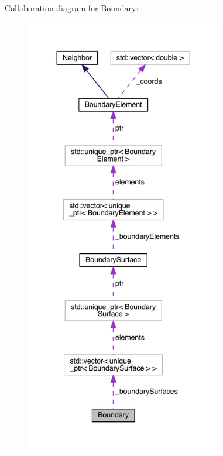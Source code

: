 Collaboration diagram for Boundary\+:
\nopagebreak
\begin{figure}[H]
\begin{center}
\leavevmode
\includegraphics[height=550pt]{classBoundary__coll__graph}
\end{center}
\end{figure}
